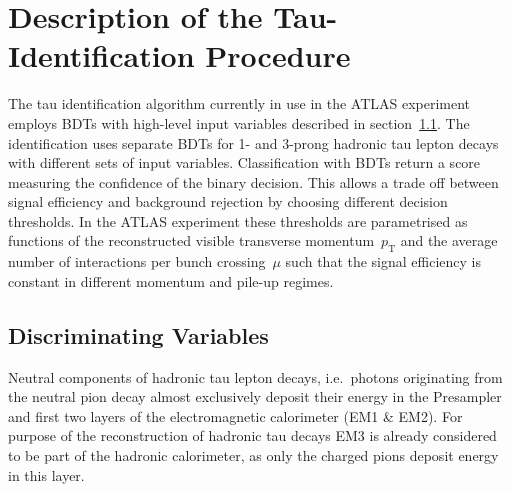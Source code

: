
\section{Description of the Tau-Identification Procedure}
\label{sec:bdt_tauid}
The tau identification algorithm currently in use in the ATLAS experiment
employs BDTs with high-level input variables described in
section~\ref{sec:bdt_features}. The identification uses separate BDTs for 1- and
3-prong hadronic tau lepton decays with different sets of input variables.
Classification with BDTs return a score measuring the confidence of the binary
decision. This allows a trade off between signal efficiency and background
rejection by choosing different decision thresholds. In the ATLAS experiment
these thresholds are parametrised as functions of the reconstructed visible
transverse momentum~$p_\text{T}$ and the average number of interactions per
bunch crossing~$\mu$ such that the signal efficiency is constant in different
momentum and pile-up regimes.

\subsection{Discriminating Variables}
\label{sec:bdt_features}

Neutral components of hadronic tau lepton decays, i.e.\ photons originating from
the neutral pion decay almost exclusively deposit their energy in the Presampler
and first two layers of the electromagnetic calorimeter (EM1 \& EM2). For
purpose of the reconstruction of hadronic tau decays EM3 is already considered
to be part of the hadronic calorimeter, as only the charged pions deposit energy
in this layer.

